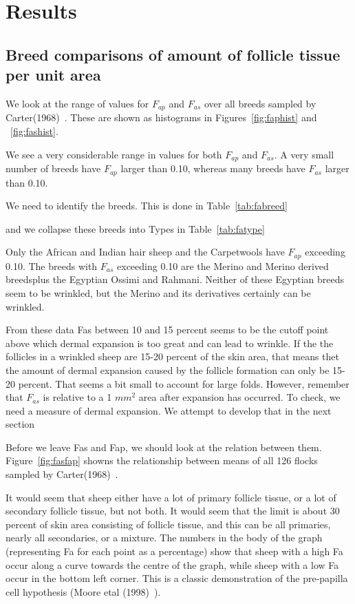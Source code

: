 \documentclass[titlepage]{article}  %
\begin{document}
\section{Results}
\subsection{Breed comparisons of amount of follicle tissue per unit area}
\label{sec:breed}

We look at the range of values for $F_{ap}$ and $F_{as}$ over all breeds sampled by Carter(1968)~\cite{cart:68}. These are shown as histograms in Figures~\ref{fig:faphist} and ~\ref{fig:fashist}.


We see a very considerable range in values for both $F_{ap}$ and $F_{as}$. A very small number of breeds have $F_{ap}$ larger than 0.10, whereas many breeds have $F_{as}$ larger than 0.10. 

We need to identify the breeds. This is done in Table~\ref{tab:fabreed}

and we collapse these breeds into Types in Table~\ref{tab:fatype}

Only the African and Indian hair sheep and the Carpetwools have $F_{ap}$ exceeding 0.10. 
The breeds with $F_{as}$ exceeding 0.10 are the Merino and Merino derived breedsplus the Egyptian  Ossimi and Rahmani. Neither of these Egyptian breeds seem to be wrinkled, but the Merino and its derivatives certainly can be wrinkled.

From these data Fas between 10 and 15 percent seems to be the cutoff point above which dermal expansion is too great and can lead to wrinkle. If the the follicles in a wrinkled sheep are 15-20 percent of the skin area, that means thet the amount of dermal expansion caused by the follicle formation can only be 15-20 percent. That seems a bit small to account for large folds. However, remember that $F_{as}$ is relative to a 1 $mm^{2}$ area after expansion has occurred. To check, we need a measure of dermal expansion. We attempt to develop that in the next section

Before we leave Fas and Fap, we should look at the relation between them. Figure~\ref{fig:fasfap} showns the relationship between means of all 126 flocks sampled by Carter(1968)~\cite{cart:68}.

 It would seem that sheep either have a lot of primary follicle tissue, or a lot of secondary follicle tissue, but not both. It would seem that the limit is about 30 percent of skin area consisting of follicle tissue, and this can be all primaries, nearly all secondaries, or a mixture.  The numbers in the body of the graph (representing Fa for each point as a percentage) show that sheep with a high Fa occur along a curve towards the centre of the graph, while sheep with a low Fa occur in the bottom left corner.  This is a classic demonstration of the pre-papilla cell hypothesis (Moore etal (1998)~\cite{moor:98}). 
\end{document}
